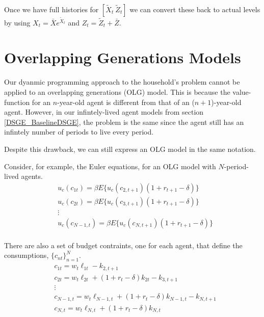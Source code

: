 \documentclass[letterpaper,12pt]{article}
\theoremstyle{definition}
\begin{document}
\begin{spacing}{1.5}
		Once we have full histories for $[\tilde X_t\> \tilde Z_t]$ we can convert these back to actual levels by using $X_t = \bar X e^{\tilde X_t}$ and $Z_t = \tilde Z_t + \bar Z$.

\section{Overlapping Generations Models}\label{Linear_OLG}
	Our dyanmic programming approach to the household's problem cannot be applied to an overlapping generations (OLG) model.  This is because the value-function for an $n$-year-old agent is different from that of an ($n+1$)-year-old agent.  However, in our infintely-lived agent models from section \ref{DSGE_BaselineDSGE}, the problem is the same since the agent still has an infintely number of periods to live every period.

	Despite this drawback, we can still express an OLG model in the same notation.

	Consider, for example, the Euler equations, for an OLG model with $N$-period-lived agents.
	\begin{equation}\label{Linear_OLGEulers}
	\begin{split}
	&u_c(c_{1t}) = \beta E\{ u_c(c_{2,t+1}) (1+r_{t+1}-\delta)\} \\
	&u_c(c_{2t}) = \beta E\{ u_c(c_{3,t+1}) (1+r_{t+1}-\delta)\} \\
	& \vdots \\
	&u_c(c_{N-1,t}) = \beta E\{ u_c(c_{N,t+1}) (1+r_{t+1}-\delta)\} \\
	\end{split}
	\end{equation}

	There are also a set of budget contraints, one for each agent, that define the consumptions, $\{ c_{nt} \}_{n=1}^N$.
	\begin{equation}\label{Linear_OLGBCs}
	\begin{split}
	&c_{1t} = w_t \ell_{1t} - k_{2,t+1} \\
	&c_{2t} = w_t \ell_{2t} + (1+r_t-\delta)k_{2t} - k_{3,t+1}  \\
	& \vdots \\
	&c_{N-1,t} = w_t \ell_{N-1,t} + (1+r_t-\delta)k_{N-1,t} - k_{N,t+1}  \\
	&c_{N,t} = w_t \ell_{N,t} + (1+r_t-\delta)k_{N,t}  \\
	\end{split}
	\end{equation}


\end{spacing}
\end{document}

